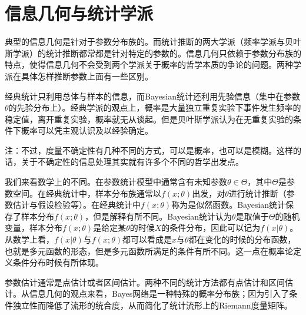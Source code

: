 \section{信息几何与统计学派}

典型的信息几何是针对于参数分布族的。而统计推断的两大学派（频率学派与贝叶斯学派）的统计推断都常都是针对特定的参数的。信息几何只依赖于参数分布族的特点，使得信息几何不会受到两个学派关于概率的哲学本质的争论的问题。两种学派在具体怎样推断参数上面有一些区别。

经典统计只利用总体与样本的信息，而Bayesian统计还利用先验信息（集中在参数$\theta$的先验分布上）。经典学派的观点上，概率是大量独立重复实验下事件发生频率的稳定值，离开重复实验，概率就无从谈起。但是贝叶斯学派认为在无重复实验的条件下概率可以凭主观认识及以经验确定。

注：不过，度量不确定性有几种不同的方式，可以是概率，也可以是模糊。这样的话，关于不确定性的信息处理其实就有许多个不同的哲学出发点。

我们来看数学上的不同。在参数统计模型中通常含有未知参数$\theta \in \Theta$，其中$\Theta$是参数空间。在经典统计中，样本分布族通常以$f(x;\theta)$出发，对$\theta$进行统计推断（参数估计与假设检验等）。在经典统计中$f(x;\theta)$称为是似然函数。Bayesian统计保存了样本分布$f(x;\theta)$，但是解释有所不同。Bayesian统计认为$\theta$是取值于$\Theta$的随机变量，样本分布$f(x;\theta)$是给定某$\theta$的时候$X$的条件分布，因此可以记为$f(x \vert \theta)$。从数学上看，$f(x \vert \theta)$与$f(x;\theta)$都可以看成是$x$与$\theta$都在变化的时候的分布函数，也就是多元函数的形态，但是多元函数所满足的条件有所不同。这一点在概率论定义条件分布时候有所体现。

参数估计通常是点估计或者区间估计。两种不同的统计方法都有点估计和区间估计。从信息几何的观点来看，Bayes网络是一种特殊的概率分布族；因为引入了条件独立性而降低了流形的统合度，从而简化了统计流形上的Riemann度量矩阵。

